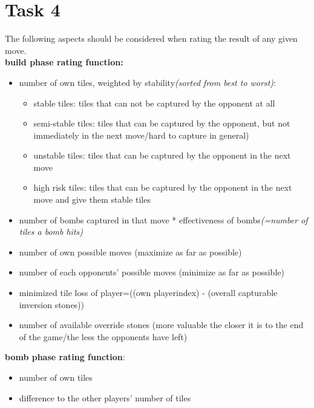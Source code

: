 \section{Task 4}

The following aspects should be considered when rating the result of any given move.
\\\textbf{build phase rating function:}
\begin{itemize}
	\item number of own tiles, weighted by stability\textit{(sorted from best to worst)}: 
		\begin{itemize}
			\item stable tiles: tiles that can not be captured by the opponent at all
			\item semi-stable tiles: tiles that can be captured by the opponent, but not immediately in the next move/hard to capture in general) 
			\item unstable tiles: tiles that can be captured by the opponent in the next move
			\item high risk tiles: tiles that can be captured by the opponent in the next move and give them stable tiles
		\end{itemize}
	\item number of bombs captured in that move * effectiveness of bombs\textit{(=number of tiles a bomb hits)}
	\item number of own possible moves (maximize as far as possible)
	\item number of each opponents' possible moves (minimize as far as possible)
	\item minimized tile loss of player=((own playerindex) - (overall capturable inversion stones))
	\item number of available override stones (more valuable the closer it is to the end of the game/the less the opponents have left)
\end{itemize}
\textbf{bomb phase rating function}:
\begin{itemize}
	\item number of own tiles
	\item difference to the other players' number of tiles
\end{itemize}
